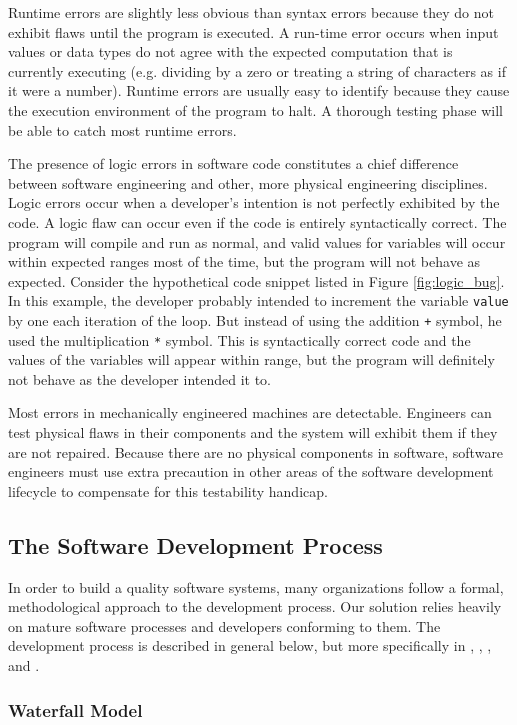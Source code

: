 Runtime errors are slightly less obvious than syntax errors because they do not 
exhibit flaws until the program is executed. A run-time error occurs when input
values or data types do not agree with the expected computation that is
currently executing (e.g. dividing by a zero or treating a string of characters
as if it were a number). Runtime errors are usually easy to identify because
they cause the execution environment of the program to halt. A thorough testing
phase will be able to catch most runtime errors.

The presence of logic errors in software code constitutes a chief difference
between software engineering and other, more physical engineering disciplines.
Logic errors occur when a developer's intention is not perfectly exhibited by
the code. A logic flaw can occur even if the code is entirely syntactically
correct. The program will compile and run as normal, and valid values for
variables will occur within expected ranges most of the time, but the program
will not behave as expected. Consider the hypothetical code snippet listed in
Figure \ref{fig:logic_bug}. In this example, the developer probably intended to
increment the variable \verb!value! by one each iteration of the loop. But
instead of using the addition \verb!+! symbol, he used the multiplication
\verb!*! symbol. This is syntactically correct code and the values of the
variables will appear within range, but the program will definitely not behave
as the developer intended it to.

Most errors in mechanically engineered machines are detectable. Engineers can
test physical flaws in their components and the system will exhibit them if they
are not repaired. Because there are no physical components in software,
software engineers must use extra precaution in other areas of the software
development lifecycle to compensate for this testability handicap.

\subsection{The Software Development Process}
In order to build a quality software systems, many organizations follow a
formal, methodological approach to the development process. Our solution relies
heavily on mature software processes and developers conforming to them. The
development process is described in general below, but more specifically in 
\cite{Royce1970}, \cite{Boehm1986}, \cite{CMM11}, and \cite{Kehoe1996}.


\subsubsection{Waterfall Model}\label{waterfall}

